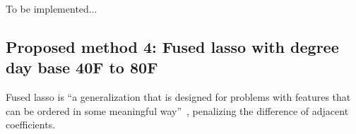 \documentclass[12pt]{article}
\begin{document}
To be implemented...

\subsection{Proposed method 4: Fused lasso with degree day base 40F to 80F}
Fused lasso is ``a generalization that is designed for problems with
features that can be ordered in some meaningful
way''~\cite{tibshirani2005sparsity}, penalizing the difference of
adjacent coefficients.

\end{document}
